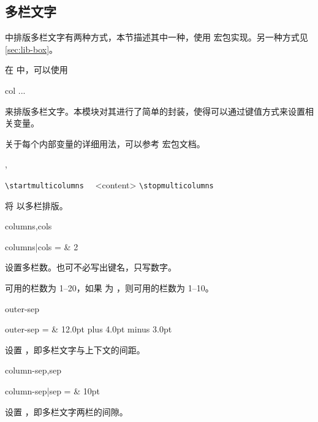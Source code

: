 \documentclass[twoside]{book}
\newcommand{\pkgdoc}[1]{\pkg{#1} 宏包文档}
\begin{document}
\subsection{多栏文字}\label{sec:multicol}

\CusTeX 中排版多栏文字有两种方式，本节描述其中一种，使用  宏包实现。另一种方式见\cref{sec:lib-box}。

在  中，可以使用 
\begin{xample}
\begin{multicols}{col}
  ... 
\end{multicols}
\stopxamplecode 
\xamplecode \medskip 
\end{xample}
来排版多栏文字。本模块对其进行了简单的封装，使得可以通过键值方式来设置相关变量。

关于每个内部变量的详细用法，可以参考 \pkgdoc{multicol}。

\begin{function}{\startmulticolumns,\stopmulticolumns}
  \begin{syntax}
    \verb|\startmulticolumns| 
    ~~<content>
    \verb|\stopmulticolumns|
  \end{syntax}
将  以多栏排版。
\end{function}

\begin{keyval}[path=multicolumns]{columns,cols}
  \begin{syntax}
    columns|cols =  & 2
  \end{syntax}
设置多栏数。也可不必写出键名，只写数字。

可用的栏数为 1--20，如果  为
，则可用的栏数为 1--10。
\end{keyval}

\begin{keyval}[path=multicolumns]{outer-sep}
  \begin{syntax}
    outer-sep =  & 12.0pt plus 4.0pt minus 3.0pt
  \end{syntax}
设置 ，即多栏文字与上下文的间距。
\end{keyval}

\begin{keyval}[path=multicolumns]{column-sep,sep}
  \begin{syntax}
    column-sep|sep =  & 10pt 
  \end{syntax}
设置 ，即多栏文字两栏的间隙。
\end{keyval}
\end{document}
